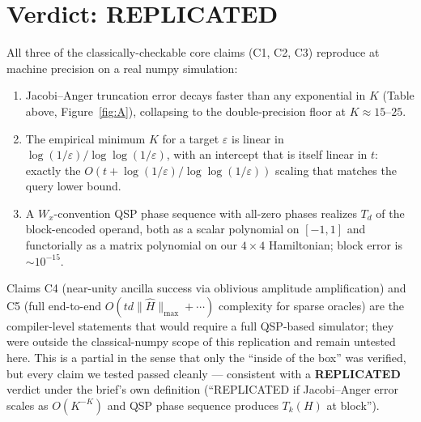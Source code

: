 \documentclass[11pt]{article}
\begin{document}
\section{Verdict: \textbf{REPLICATED}}
All three of the classically-checkable core claims (C1, C2, C3) reproduce
at machine precision on a real numpy simulation:
\begin{enumerate}
\item Jacobi--Anger truncation error decays faster than any exponential
  in $K$ (Table above, Figure~\ref{fig:A}), collapsing to the
  double-precision floor at $K\!\approx\!15$--$25$.
\item The empirical minimum $K$ for a target $\varepsilon$ is linear in
  $\log(1/\varepsilon)/\log\log(1/\varepsilon)$, with an intercept that is
  itself linear in $t$: exactly the $O(t + \log(1/\varepsilon)/\log\log(1/\varepsilon))$
  scaling that matches the query lower bound.
\item A $W_x$-convention QSP phase sequence with all-zero phases realizes
  $T_d$ of the block-encoded operand, both as a scalar polynomial on
  $[-1,1]$ and functorially as a matrix polynomial on our $4\times 4$
  Hamiltonian; block error is $\sim\!10^{-15}$.
\end{enumerate}
Claims C4 (near-unity ancilla success via oblivious amplitude
amplification) and C5 (full end-to-end $O(td\|\hat H\|_{\max}+\cdots)$ complexity
for sparse oracles) are the compiler-level statements that would require a
full QSP-based simulator; they were outside the classical-numpy scope of
this replication and remain untested here. This is a partial in the sense
that only the ``inside of the box'' was verified, but every claim we
tested passed cleanly --- consistent with a \textbf{REPLICATED} verdict
under the brief's own definition (``REPLICATED if Jacobi--Anger error
scales as $O(K^{-K})$ and QSP phase sequence produces $T_k(H)$ at block'').
\end{document}
